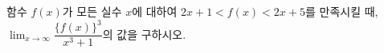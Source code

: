 함수 $f(x)$가 모든 실수 $x$에 대하여 $2x+1<f(x)<2x+5$를 만족시킬 때, $\displaystyle\lim_{x\to\infty}\dfrac{\{f(x)\}^3}{x^3+1}$의 값을 구하시오.
